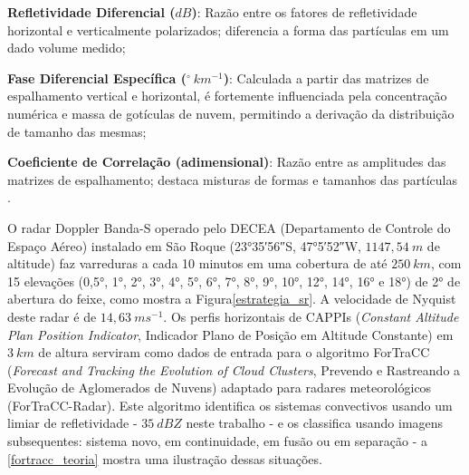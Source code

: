 \begin{alineas}
	\item \textbf{Refletividade Diferencial ($dB$)}: Razão entre os fatores de refletividade horizontal e verticalmente polarizados; diferencia a forma das partículas em um dado volume medido;
	\item \textbf{Fase Diferencial Específica ($^\circ\:km^{-1}$)}: Calculada a partir das matrizes de espalhamento vertical e horizontal, é fortemente influenciada pela concentração numérica e massa de gotículas de nuvem, permitindo a derivação da distribuição de tamanho das mesmas;
	\item \textbf{Coeficiente de Correlação (adimensional)}: Razão entre as amplitudes das matrizes de espalhamento; destaca misturas de formas e tamanhos das partículas \cite{Rauber2018}.
\end{alineas}

O radar Doppler Banda-S operado pelo DECEA (Departamento de Controle do Espaço Aéreo) instalado em São Roque (\ang{23;35;56}\:S, \ang{47;5;52}\:W, $1147,54\:m$ de altitude) faz varreduras a cada 10 minutos em uma cobertura de até $250\:km$, com 15 elevações (\ang{0,5}, \ang{1}, \ang{2}, \ang{3}, \ang{4}, \ang{5}, \ang{6}, \ang{7}, \ang{8}, \ang{9}, \ang{10}, \ang{12}, \ang{14}, \ang{16} e \ang{18}) de \ang{2} de abertura do feixe, como mostra a Figura\autoref{estrategia_sr}. A velocidade de Nyquist deste radar é de $14,63\:ms^{-1}$. Os perfis horizontais de CAPPIs (\textit{Constant Altitude Plan Position Indicator}, Indicador Plano de Posição em Altitude Constante) em $3\:km$ de altura serviram como dados de entrada para o algoritmo ForTraCC (\textit{Forecast and Tracking the Evolution of Cloud Clusters}, Prevendo e Rastreando a Evolução de Aglomerados de Nuvens) \cite{Vila2008} adaptado para radares meteorológicos (ForTraCC-Radar). Este algoritmo identifica os sistemas convectivos usando um limiar de refletividade - $35\:dBZ$ neste trabalho - e os classifica usando imagens subsequentes: sistema novo, em continuidade, em fusão ou em separação - a \autoref{fortracc_teoria} mostra uma ilustração dessas situações.

